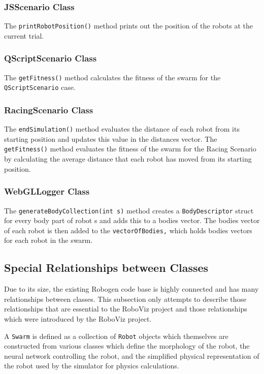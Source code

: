\documentclass[11pt,a4paper]{article}
\begin{document}
\subsubsection{JSScenario Class}
The \texttt{printRobotPosition()} method prints out the position of the robots at the
current trial.

\subsubsection{QScriptScenario Class}
The \texttt{getFitness()} method calculates the fitness of the swarm for the
\texttt{QScriptScenario} case.

\subsubsection{RacingScenario Class}
The \texttt{endSimulation()} method evaluates the distance of each robot from its
starting position and updates this value in the distances vector.  The
\texttt{getFitness()} method evaluates the fitness of the swarm for the Racing Scenario
by calculating the average distance that each robot has moved from its starting
position.

\subsubsection{WebGLLogger Class}
The \texttt{generateBodyCollection(int s)} method creates a \texttt{BodyDescriptor} struct for
every body part of robot s and adds this to a bodies vector. The bodies vector
of each robot is then added to the \texttt{vectorOfBodies,} which holds bodies vectors
for each robot in the swarm.

\subsection{Special Relationships between Classes}
Due to its size, the existing Robogen code base is highly connected and has
many relationships between classes. This subsection only attempts to describe
those relationships that are essential to the RoboViz project and those
relationships which were introduced by the RoboViz project.

A \texttt{Swarm} is defined as a collection of \texttt{Robot} objects which
themselves are constructed from various classes which define the morphology of
the robot, the neural network controlling the robot, and the simplified
physical representation of the robot used by the simulator for physics
calculations.
\end{document}
